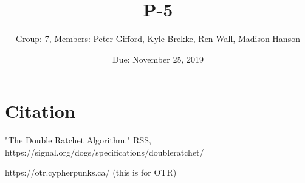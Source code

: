 \documentclass{article}
\title{P-5}
\author{Group: 7, Members: Peter Gifford, Kyle Brekke, Ren Wall, Madison Hanson}
\date{Due: November 25, 2019}
\begin{document}
\maketitle



\section{Citation}

"The Double Ratchet Algorithm." RSS, https://signal.org/dogs/specifications/doubleratchet/

https://otr.cypherpunks.ca/ (this is for OTR)
    
	
	    
\end{document}
